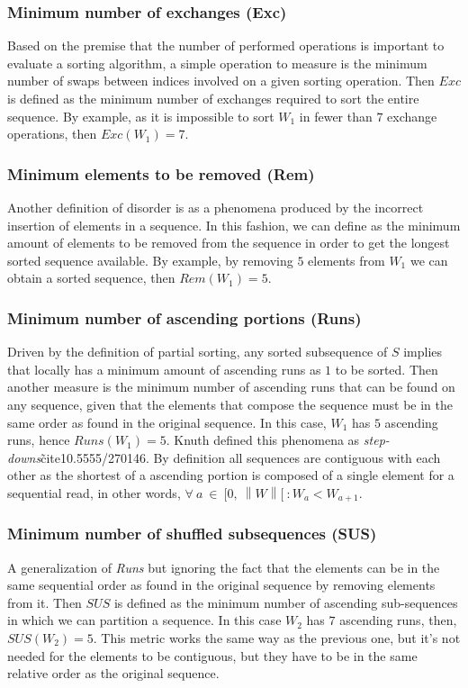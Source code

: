 \subsubsection{Minimum number of exchanges (Exc)}
Based on the premise that the number of performed operations is important to evaluate a sorting algorithm, a simple operation to measure is the minimum number of swaps between indices involved on a given sorting operation. Then $Exc$ is defined as the minimum number of exchanges required to sort the entire sequence\cite{Mannila_1985}. By example, as it is impossible to sort $W_1$ in fewer than $7$ exchange operations, then $Exc(W_1)=7$.

\subsubsection{Minimum elements to be removed (Rem)}
Another definition of disorder is as a phenomena produced by the incorrect insertion of elements in a sequence\cite{10.5555/270146}. In this fashion, we can define as the minimum amount of elements to be removed from the sequence in order to get the longest sorted sequence available. By example, by removing $5$ elements from $W_1$ we can obtain a sorted sequence, then $Rem(W_1) = 5$.

\subsubsection{Minimum number of ascending portions (Runs)}
Driven by the definition of partial sorting\cite{10.5555/1614191}, any sorted subsequence of $S$ implies that locally has a minimum amount of ascending runs as $1$ to be sorted. Then another measure is the minimum number of ascending runs that can be found on any sequence, given that the elements that compose the sequence must be in the same order as found in the original sequence. In this case, $W_1$ has $5$ ascending runs, hence $Runs(W_1) =5$. Knuth defined this phenomena as \textit{step-downs}\~cite{10.5555/270146}. By definition all sequences are contiguous with each other as the shortest of a ascending portion is composed of a single element for a sequential read, in other words, $\forall~a~\in~[0,~\left\|W\right\|[~: W_a < W_{a+1}$.

\subsubsection{Minimum number of shuffled subsequences (SUS)}
A generalization of \textit{Runs} but ignoring the fact that the elements can be in the same sequential order as found in the original sequence by removing elements from it. Then $SUS$ is defined as the minimum number of ascending sub-sequences in which we can partition a sequence\cite{Carlsson_Levcopoulos_Petersson_1993}. In this case $W_2$ has $7$ ascending runs, then, $SUS(W_2) = 5$. This metric works the same way as the previous one, but it's not needed for the elements to be contiguous, but they have to be in the same relative order as the original sequence.


